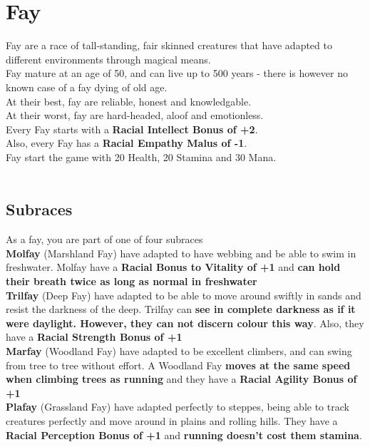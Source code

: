 \section{Fay}\label{race:fay}
Fay are a race of tall-standing, fair skinned creatures that have adapted to different environments through magical means.\\
Fay mature at an age of 50, and can live up to 500 years - there is however no known case of a fay dying of old age.\\
At their best, fay are reliable, honest and knowledgable.\\
At their worst, fay are hard-headed, aloof and emotionless.\\
Every Fay starts with a \textbf{Racial Intellect Bonus of +2}.\\
Also, every Fay has a \textbf{Racial Empathy Malus of -1}.\\
Fay start the game with 20 Health, 20 Stamina and 30 Mana.\\
\\ 
\subsection{Subraces}
As a fay, you are part of one of four subraces\\

\textbf{Molfay} (Marshland Fay) have adapted to have webbing and be able to swim in freshwater.
Molfay have a \textbf{Racial Bonus to Vitality of +1} and \textbf{can hold their breath twice as long as normal in freshwater}\\


\textbf{Trilfay} (Deep Fay) have adapted to be able to move around swiftly in sands and resist the darkness of the deep.
Trilfay can \textbf{see in complete darkness as if it were daylight. However, they can not discern colour this way}.
Also, they have a \textbf{Racial Strength Bonus of +1}\\


\textbf{Marfay} (Woodland Fay) have adapted to be excellent climbers, and can swing from tree to tree without effort.
A Woodland Fay \textbf{moves at the same speed when climbing trees as running} and they have a  \textbf{Racial Agility Bonus of +1}\\


\textbf{Plafay} (Grassland Fay) have adapted perfectly to steppes, being able to track creatures perfectly and move around in plains and rolling hills.
They have a \textbf{Racial Perception Bonus of +1} and \textbf{running doesn't cost them stamina}.